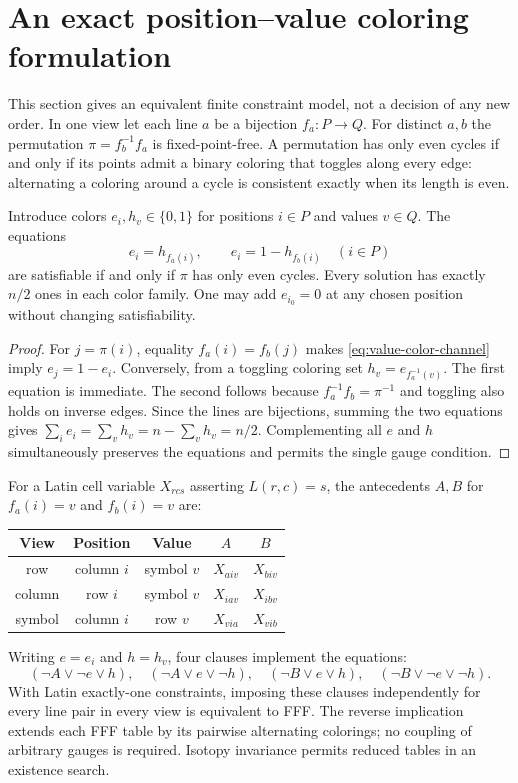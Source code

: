\section{An exact position--value coloring formulation}
\label{sec:value-color}

This section gives an equivalent finite constraint model, not a decision
of any new order. In one view let each line $a$ be a bijection
$f_a:P\to Q$. For distinct $a,b$ the permutation
$\pi=f_b^{-1}f_a$ is fixed-point-free. A permutation has only even
cycles if and only if its points admit a binary coloring that toggles
along every edge: alternating a coloring around a cycle is consistent
exactly when its length is even.

\begin{theorem}
\label{thm:value-color-channel}
Introduce colors $e_i,h_v\in\{0,1\}$ for positions $i\in P$ and
values $v\in Q$. The equations
\begin{equation}
 e_i=h_{f_a(i)},\qquad e_i=1-h_{f_b(i)}\quad(i\in P)
 \label{eq:value-color-channel}
\end{equation}
are satisfiable if and only if $\pi$ has only even cycles. Every
solution has exactly $n/2$ ones in each color family. One may
add $e_{i_0}=0$ at any chosen position without changing satisfiability.
\end{theorem}

\begin{proof}
For $j=\pi(i)$, equality $f_a(i)=f_b(j)$ makes
\eqref{eq:value-color-channel} imply $e_j=1-e_i$.
Conversely, from a toggling coloring set $h_v=e_{f_a^{-1}(v)}$.
The first equation is immediate. The second follows because
$f_a^{-1}f_b=\pi^{-1}$ and toggling also holds on inverse edges.
Since the lines are bijections, summing the two equations gives
$\sum_i e_i=\sum_v h_v=n-\sum_v h_v=n/2$.
Complementing all $e$ and $h$ simultaneously preserves the
equations and permits the single gauge condition.
\end{proof}

For a Latin cell variable $X_{rcs}$ asserting $L(r,c)=s$, the
antecedents $A,B$ for $f_a(i)=v$ and $f_b(i)=v$ are:
\begin{center}
\begin{tabular}{ccccc}
\toprule
View & Position & Value & $A$ & $B$\\
\midrule
row & column $i$ & symbol $v$ & $X_{aiv}$ & $X_{biv}$\\
column & row $i$ & symbol $v$ & $X_{iav}$ & $X_{ibv}$\\
symbol & column $i$ & row $v$ & $X_{via}$ & $X_{vib}$\\
\bottomrule
\end{tabular}
\end{center}
Writing $e=e_i$ and $h=h_v$, four clauses implement the equations:
\[
 (\neg A\vee\neg e\vee h),\quad(\neg A\vee e\vee\neg h),\quad
 (\neg B\vee e\vee h),\quad(\neg B\vee\neg e\vee\neg h).
\]
With Latin exactly-one constraints, imposing these clauses
independently for every line pair in every view is equivalent to FFF.
The reverse implication extends each FFF table by its pairwise
alternating colorings; no coupling of arbitrary gauges is required.
Isotopy invariance permits reduced tables in an existence search.

